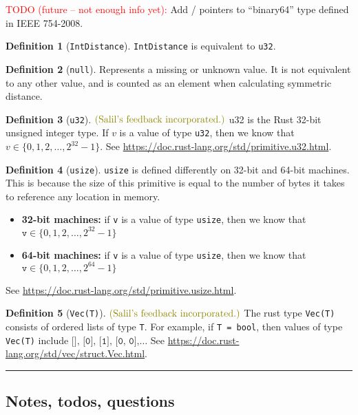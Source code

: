 \documentclass[11pt,a4paper]{article}
\theoremstyle{definition}
\newtheorem{definition}{Definition}[section]
\newcommand{\horizline}{\noindent\rule{\textwidth}{1pt}}
\newcommand{\sfi}{\text{\textcolor{olive}{(Salil's feedback incorporated.)}}}
\newcommand{\inRust}[2]{See \url{#2}.}
\newcommand{\todonei}{{\textcolor{red}{TODO (future -- not enough info yet): }}}
\begin{document}
\todonei{Add / pointers to  ``binary64” type defined in IEEE 754-2008.}

\begin{definition}[\texttt{IntDistance}]
\texttt{IntDistance} is equivalent to \texttt{u32}.
\end{definition}

\begin{definition}[\texttt{null}]
    Represents a missing or unknown value. It is not equivalent to any other value, and is counted as an element when calculating symmetric distance.
\end{definition}

\begin{definition}[\texttt{u32}]$\sfi$
    u32 is the Rust 32-bit unsigned integer type. If $v$ is a value of type \texttt{u32}, then we know that $v\in \{0,1,2,\ldots, 2^{32}-1\}$. \inRust{u32}{https://doc.rust-lang.org/std/primitive.u32.html}
\end{definition}

\begin{definition}[\texttt{usize}]
    \texttt{usize} is defined differently on 32-bit and 64-bit machines. This is because the size of this primitive is equal to the number of bytes it takes to reference any location in memory.
    \begin{itemize}
        \item \textbf{32-bit machines:} if \texttt{v} is a value of type \texttt{usize}, then we know that $\texttt{v}\in \{0,1,2,\ldots,2^{32} - 1\}$
        \item \textbf{64-bit machines:} if \texttt{v} is a value of type \texttt{usize}, then we know that $\texttt{v}\in \{0,1,2,\ldots,2^{64} - 1\}$
    \end{itemize}
    \inRust{usize}{https://doc.rust-lang.org/std/primitive.usize.html}
\end{definition}

\begin{definition}[\texttt{Vec(T)}]$\sfi$
    The rust type \texttt{Vec(T)} consists of ordered lists of type \texttt{T}. For example, if \texttt{T = bool}, then values of type \texttt{Vec(T)} include $\texttt{[], [0], [1], [0, 0],} \ldots$ \inRust{Vec<T>}{https://doc.rust-lang.org/std/vec/struct.Vec.html}
\end{definition}

\horizline

\subsection{Notes, todos, questions}
\end{document}
